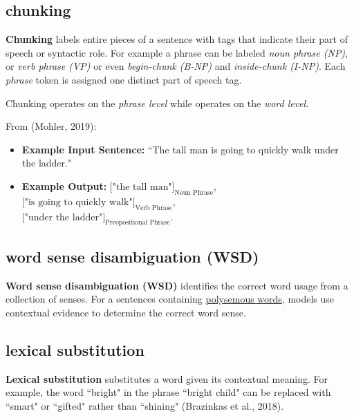 \subsection{chunking} \label{nlptask:chunking}

\textbf{Chunking} labels entire pieces of a sentence with tags that indicate their part of speech or syntactic role. For example a phrase can be labeled \emph{noun phrase (NP)}, or \emph{verb phrase (VP)} or even \emph{begin-chunk (B-NP)} and \emph{inside-chunk (I-NP)}. Each \emph{phrase} token is assigned one distinct part of speech tag. 

Chunking operates on the \emph{phrase level} while  operates on the \emph{word level}. 

From (Mohler, 2019): 
\begin{itemize}
    \item \textbf{Example Input Sentence: } ``The tall man is going to quickly walk under the ladder."
    
    \item \textbf{Example Output: } $\Big[ \text{"the tall man"}\Big]_\text{Noun Phrase}$, \ $\Big[ \text{"is going to quickly walk"}\Big]_\text{Verb Phrase}$, \\ $\Big[ \text{"under the ladder"}\Big]_\text{Preopositional Phrase}$.
\end{itemize}




\subsection{word sense disambiguation (WSD)} \label{nlptask:wordsensedisambiguatioNWSD}

\textbf{Word sense disambiguation (WSD)} identifies the correct word usage from a collection of senses. For a sentences containing \hyperref[sec:Polysemy]{polysemous words}, models use contextual evidence to determine the correct word sense. 



\subsection{lexical substitution} \label{nlptask:lexicalsubstitution}

\textbf{Lexical substitution} substitutes a word given its contextual meaning. For example, the word ``bright" in the phrase ``bright child" can be replaced with ``smart" or ``gifted" rather than ``shining" (Brazinkas et al., 2018). 

